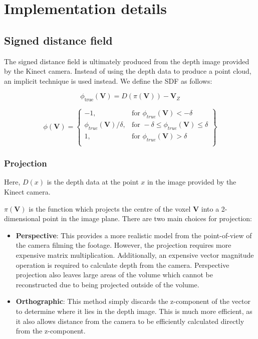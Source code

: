 \documentclass[12pt,twoside]{report}
\begin{document}
\chapter{Implementation details}


\section{Signed distance field}

The signed distance field is ultimately produced from the depth image provided by the Kinect camera. 
Instead of using the depth data to produce a point cloud, an implicit technique is used instead.
We define the SDF as follows:

$$\phi_{\text{true}}(\textbf{V}) = D(\pi(\textbf{V})) - \textbf{V}_Z$$

\[
    \phi(\textbf{V}) = \left\{\begin{array}{lr}
    -1,                    & \text{for } \phi_{true}(\textbf{V}) < - \delta\\
    \phi_{true}(\textbf{V}) / \delta, & \text{for } -\delta \leq \phi_{true}(\textbf{V}) \leq \delta \\
    1,                     & \text{for } \phi_{true}(\textbf{V}) > \delta\\
    \end{array}\right\}
\]

\subsection{Projection}

Here, $D(x)$ is the depth data at the point $x$ in the image provided by the Kinect camera.

$\pi(\textbf{V})$ is the function which projects the centre of the voxel \textbf{V} into a 2-dimensional point in the image plane. There are two main choices for projection:
\begin{itemize}
\item \textbf{Perspective}: This provides a more realistic model from the point-of-view of the camera filming the footage. 
However, the projection requires more expensive matrix multiplication. Additionally, an expensive vector magnitude operation is required to calculate depth from the camera.
Perspective projection also leaves large areas of the volume which cannot be reconstructed due to being projected outside of the volume.

\item \textbf{Orthographic}: This method simply discards the z-component of the vector to determine where it lies in the depth image. This is much more efficient, as it also allows distance from the camera to be efficiently calculated directly from the z-component.
\end{itemize} 
\end{document}
